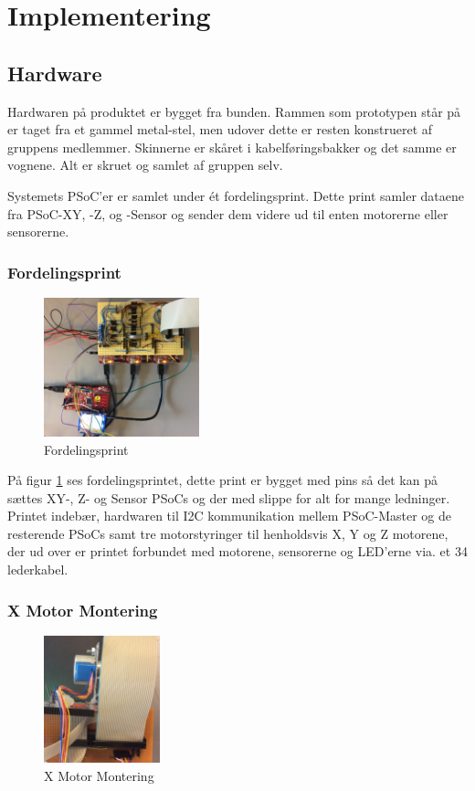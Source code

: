 \section{Implementering}

\subsection{Hardware}

Hardwaren på produktet er bygget fra bunden. Rammen som prototypen står på er taget fra et gammel metal-stel, men udover dette er resten konstrueret af gruppens medlemmer. Skinnerne er skåret i kabelføringsbakker og det samme er vognene. Alt er skruet og samlet af gruppen selv. 

Systemets PSoC'er er samlet under ét fordelingsprint. Dette print samler dataene fra PSoC-XY, -Z, og -Sensor og sender dem videre ud til enten motorerne eller sensorerne. 

\subsubsection{Fordelingsprint}
\begin{figure}[H] \centering
    \includegraphics[width=0.4\textwidth]{Filer/FordelingsPrint.PNG}
    \caption{Fordelingsprint}
    \label{fig:Fordelingsprint}
\end{figure}

På figur \ref{fig:Fordelingsprint} ses fordelingsprintet, dette print er bygget med pins så det kan på sættes XY-, Z- og Sensor PSoCs og der med slippe for alt for mange ledninger. Printet indebær, hardwaren til I2C kommunikation mellem PSoC-Master og de resterende PSoCs samt tre motorstyringer til henholdsvis X, Y og Z motorene, der ud over er printet forbundet med motorene, sensorerne og LED'erne via. et 34 lederkabel.

\subsubsection{X Motor Montering}
\begin{figure}[H] \centering
    \includegraphics[width=0.3\textwidth]{Filer/XMotorMont.PNG}
    \caption{X Motor Montering}
    \label{fig:XMotorMont}
\end{figure}

